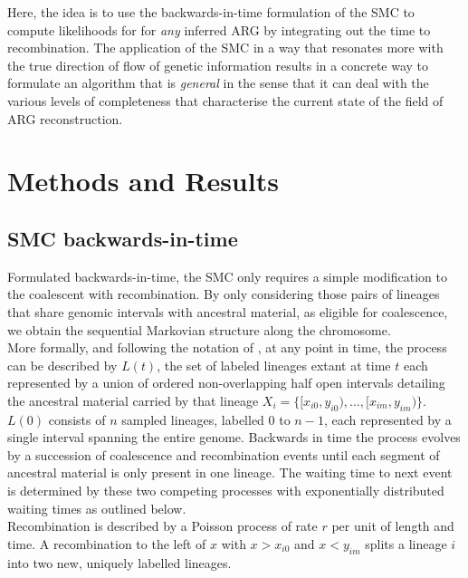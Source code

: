 \documentclass{article}
\begin{document}

Here, the idea is to use the backwards-in-time formulation of the SMC to 
compute likelihoods for for \textit{any} inferred ARG 
by integrating out the time to recombination.
The application of the SMC in a way that resonates more 
with the true direction of flow of genetic information 
results in a concrete way to formulate an algorithm 
that is \textit{general} in the sense that it can deal with the various levels of 
completeness that characterise the current state of the field of ARG reconstruction.


\section{Methods and Results}
\subsection{SMC backwards-in-time}\label{par:description}

Formulated backwards-in-time, the SMC \citep{mcvean_approximating_2005} only requires a 
simple modification to the 
coalescent with recombination. By only considering those pairs of 
lineages that share 
genomic intervals with ancestral material, as eligible for coalescence, we obtain the 
sequential Markovian structure along the chromosome.\\

More formally, and following the notation of \citet{mcvean_approximating_2005}, at any 
point in time, the process can be described by $L(t)$, the set of labeled lineages 
extant at time $t$ each represented by a union of ordered non-overlapping half open 
intervals detailing the ancestral material 
carried by that lineage $X_i = \{[x_{i0}, y_{i0}), \dotsc, [x_{im}, y_{im})\}$.
$L(0)$ consists of $n$ sampled lineages, labelled $0$ to $n-1$, each represented by a 
single interval spanning the entire genome.
Backwards in time the process evolves by a succession of coalescence and recombination 
events until each segment of ancestral material is only present in one lineage. 
The waiting time to next event is determined by these two competing processes 
with exponentially distributed waiting times as outlined below.\\

Recombination is described by a Poisson process of rate $r$ per unit of length and time. 
A recombination to the 
left of $x$ with $x>x_{i0}$ and $x<y_{im}$ splits a lineage $i$ into two new, uniquely 
labelled lineages. \\ %
\end{document}
